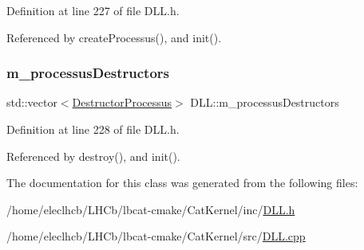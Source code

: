 Definition at line 227 of file D\+L\+L.\+h.



Referenced by create\+Processus(), and init().

\mbox{\label{classDLL_a5a00cc3723ff34be55c621505f15fc08}} 
\subsubsection{\texorpdfstring{m\+\_\+processus\+Destructors}{m\_processusDestructors}}
{\footnotesize\ttfamily std\+::vector$<$\hyperlink{classDLL_a203a61b2a683e2751b5f3fe5a7187a7e}{Destructor\+Processus}$>$ D\+L\+L\+::m\+\_\+processus\+Destructors\hspace{0.3cm}{\ttfamily [private]}}



Definition at line 228 of file D\+L\+L.\+h.



Referenced by destroy(), and init().



The documentation for this class was generated from the following files\+:\begin{DoxyCompactItemize}
\item 
/home/eleclhcb/\+L\+H\+Cb/lbcat-\/cmake/\+Cat\+Kernel/inc/\hyperlink{DLL_8h}{D\+L\+L.\+h}\item 
/home/eleclhcb/\+L\+H\+Cb/lbcat-\/cmake/\+Cat\+Kernel/src/\hyperlink{DLL_8cpp}{D\+L\+L.\+cpp}\end{DoxyCompactItemize}
